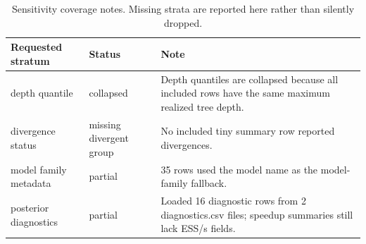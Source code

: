 \begin{table}[t]
\centering
\caption{Sensitivity coverage notes. Missing strata are reported here rather than silently dropped.}
\label{tab:sensitivity-coverage}
\begin{tabular}{lll}
\hline
Requested stratum & Status & Note \\
\hline
depth quantile & collapsed & Depth quantiles are collapsed because all included rows have the same maximum realized tree depth. \\
divergence status & missing divergent group & No included tiny summary row reported divergences. \\
model family metadata & partial & 35 rows used the model name as the model-family fallback. \\
posterior diagnostics & partial & Loaded 16 diagnostic rows from 2 diagnostics.csv files; speedup summaries still lack ESS/s fields. \\
\hline
\end{tabular}
\end{table}
